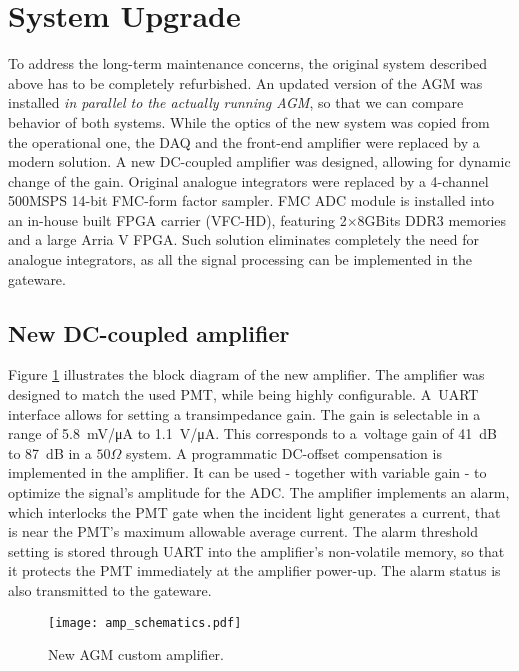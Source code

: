 \section{System Upgrade}
To address the long-term maintenance concerns, the original system described above has to be completely refurbished. 
%
An updated version of the AGM was installed \textit{in parallel to the actually running AGM}, so that we can compare behavior of both systems.
%
While the optics of the new system was copied from the operational one, the DAQ and the front-end amplifier were replaced by a modern solution.
%
A new DC-coupled amplifier was designed, allowing for dynamic change of the gain.
%
Original analogue integrators were replaced by a 4-channel 500MSPS 14-bit FMC-form factor sampler.
%
FMC ADC module is installed into an in-house built FPGA carrier (VFC-HD), featuring 2$\times 8$GBits DDR3 memories and a large Arria V FPGA.
%
Such solution eliminates completely the need for analogue integrators, as all the signal processing can be implemented in the gateware.  

\subsection{New DC-coupled amplifier}

Figure \ref{fig:amp_schematics} illustrates the block diagram of the new amplifier.
%
The amplifier was designed to match the used PMT, while being highly configurable.
%
A~UART interface allows for setting a transimpedance gain.
%
The gain is selectable in a range of \SI{5.8}{mV/\micro A} to \SI{1.1}{V/\micro A}.
%
This corresponds to a~voltage gain of \SI{41}{dB} to \SI{87}{dB} in a $50\Omega$ system.
%
A programmatic DC-offset compensation is implemented in the amplifier.
%
It can be used - together with variable gain - to optimize the signal's amplitude for the ADC.
%
The amplifier implements an alarm, which interlocks the PMT gate when the incident light generates a current, that is near the PMT's maximum allowable average current.
%
The alarm threshold setting is stored through UART into the amplifier's non-volatile memory, so that it protects the PMT immediately at the amplifier power-up.
%
The alarm status is also transmitted to the gateware.
%
\begin{figure}[!tbh]
    \centering
    \texttt{[image: amp\_schematics.pdf]}
    \caption{New AGM custom amplifier.}
    \label{fig:amp_schematics}
\end{figure}
%
